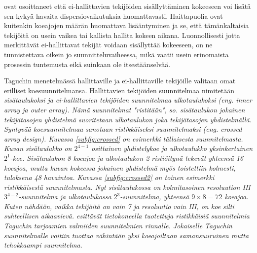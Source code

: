 \documentclass[12pt,a4paper,finnish]{tutthesis}
\begin{document}
\textcite{steinberg1994,Steinberg1998,Berube1998} ovat osoittaneet
että ei-hallittavien tekijöiden sisällyttäminen kokeeseen voi
lisätä sen kykyä havaita dispersiovaikutuksia huomattavasti.
Haittapuolia ovat kuitenkin koeajojen määrän huomattava lisääntyminen
ja se, että tämänkaltaisia tekijöitä on usein vaikea
tai kallista hallita kokeen aikana. Luonnollisesti jotta merkittävät ei-hallittavat
tekijät voidaan sisällyttää kokeeseen, on ne tunnistettava oikein jo
suunnitteluvaiheessa, mikä vaatii usein erinomaista prosessin tuntemusta
eikä suinkaan ole itsestäänselvää.

Taguchin menetelmässä hallittaville ja ei-hallittaville
tekijöille valitaan omat erilliset koesuunnitelmansa.
Hallittavien tekijöiden suunnitelmaa nimitetään \em sisätaulukoksi \em
ja ei-hallittavien tekijöiden suunnitelmaa \em ulkotaulukoksi \em
(eng. inner array ja outer array).
Nämä suunnitelmat
"ristitään", so. sisätaulukon jokainen tekijätasojen yhdistelmä
suoritetaan ulkotaulukon joka tekijätasojen yhdistelmällä. Syntyvää
koesuunnitelmaa sanotaan \em ristikkäiseksi suunnitelmaksi \em
(eng. crossed array design). Kuvassa \ref{subfig:crossed} on esimerkki tällaisesta suunnitelmasta.
Kuvan sisätaulukko on \(2^{4-1}\) osittainen yhdistelykoe ja ulkotaulukko
yksinkertainen \(2^1\)-koe. Sisätaulukon 8 koeajoa ja ulkotaulukon 2
ristiöitynä tekevät yhteensä 16 koeajoa, mutta kuvan kokeessa jokainen
yhdistelmä myös toistettiin kolmesti, tuloksena 48 havaintoa.
Kuvassa \ref{subfig:crossed2}
on toinen esimerkki ristikkäisestä suunnitelmasta. Nyt sisätaulukossa
on kolmitasoinen resoluution III \(3^{4-2}\)-suunnitelma ja ulkotaulukossa \(2^3\)-suunnitelma,
yhteensä \(9\times 8=72\) koeajoa. Kuten nähdään, vaikka tekijöitä on vain
7 ja resoluutio vain III, on koe silti suhteellisen aikaavievä.
\textcite{Hijar-Rivera2009} esittävät tietokoneella tuotettuja ristikkäisiä
suunnitelmia Taguchin tarjoamien valmiiden suunnitelmien rinnalle.
Jokaiselle Taguchin suunnitelmalle voitiin tuottaa vähintään yksi koeajoiltaan samansuuruinen
mutta tehokkaampi suunnitelma.
\end{document}
